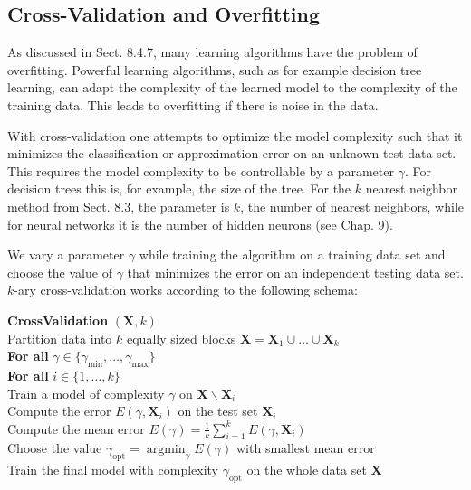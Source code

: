\documentclass[10pt]{book}
\begin{document}
\subsection{Cross-Validation and Overfitting}
As discussed in Sect. 8.4.7, many learning algorithms have the problem of overfitting. Powerful learning algorithms, such as for example decision tree learning, can adapt the complexity of the learned model to the complexity of the training data. This leads to overfitting if there is noise in the data.

With cross-validation one attempts to optimize the model complexity such that it minimizes the classification or approximation error on an unknown test data set. This requires the model complexity to be controllable by a parameter $\gamma$. For decision trees this is, for example, the size of the tree. For the $k$ nearest neighbor method from Sect. 8.3, the parameter is $k$, the number of nearest neighbors, while for neural networks it is the number of hidden neurons (see Chap. 9).

We vary a parameter $\gamma$ while training the algorithm on a training data set and choose the value of $\gamma$ that minimizes the error on an independent testing data set. $k$-ary cross-validation works according to the following schema:

\begin{flushleft}
\textbf{CrossValidation} $(\boldsymbol{X}, k)$\\
Partition data into $k$ equally sized blocks $\boldsymbol{X}=\boldsymbol{X}_{1} \cup \ldots \cup \boldsymbol{X}_{k}$\\
\textbf{For all} $\gamma \in \{\gamma_{\min}, \ldots, \gamma_{\max}\}$\\
\quad \textbf{For all} $i \in \{1, \ldots, k\}$\\
\qquad Train a model of complexity $\gamma$ on $\boldsymbol{X} \backslash \boldsymbol{X}_{i}$\\
\qquad Compute the error $E(\gamma, \boldsymbol{X}_{i})$ on the test set $\boldsymbol{X}_{i}$\\
\quad Compute the mean error $E(\gamma)=\frac{1}{k} \sum_{i=1}^{k} E(\gamma, \boldsymbol{X}_{i})$\\
Choose the value $\gamma_{\text{opt}}=\operatorname{argmin}_{\gamma} E(\gamma)$ with smallest mean error\\
Train the final model with complexity $\gamma_{\text{opt}}$ on the whole data set $\boldsymbol{X}$
\end{flushleft}
\end{document}
